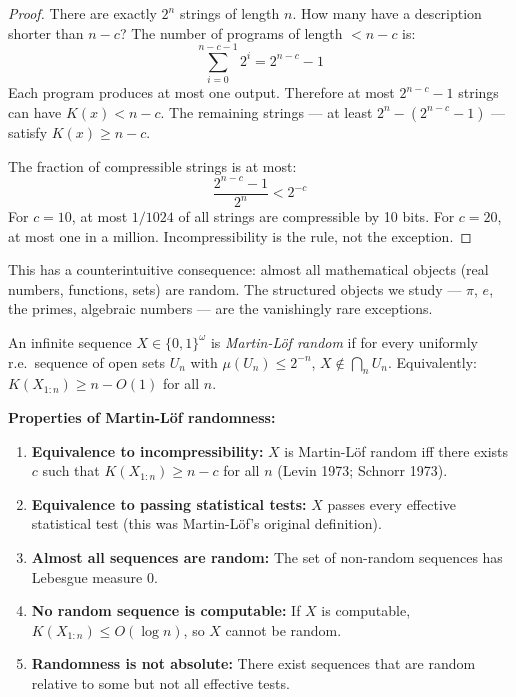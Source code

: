 \begin{proof}
There are exactly $2^n$ strings of length $n$. How many have a description shorter than $n-c$? The number of programs of length $< n-c$ is:
\[
\sum_{i=0}^{n-c-1} 2^i = 2^{n-c} - 1
\]
Each program produces at most one output. Therefore at most $2^{n-c} - 1$ strings can have $K(x) < n-c$. The remaining strings --- at least $2^n - (2^{n-c} - 1)$ --- satisfy $K(x) \ge n-c$.

The fraction of compressible strings is at most:
\[
\frac{2^{n-c} - 1}{2^n} < 2^{-c}
\]
For $c = 10$, at most $1/1024$ of all strings are compressible by 10 bits. For $c = 20$, at most one in a million. Incompressibility is the rule, not the exception.
\end{proof}

This has a counterintuitive consequence: almost all mathematical objects (real numbers, functions, sets) are random. The structured objects we study --- $\pi$, $e$, the primes, algebraic numbers --- are the vanishingly rare exceptions.

\begin{definition}
An infinite sequence $X \in \{0,1\}^\omega$ is \emph{Martin-L\"of random} if for every uniformly r.e.\ sequence of open sets $U_n$ with $\mu(U_n) \le 2^{-n}$, $X \notin \bigcap_n U_n$. Equivalently: $K(X_{1:n}) \ge n - O(1)$ for all $n$.
\end{definition}

\textbf{Properties of Martin-L\"of randomness:}
\begin{enumerate}
\item \textbf{Equivalence to incompressibility:} $X$ is Martin-L\"of random iff there exists $c$ such that $K(X_{1:n}) \ge n - c$ for all $n$ (Levin 1973; Schnorr 1973).
\item \textbf{Equivalence to passing statistical tests:} $X$ passes every effective statistical test (this was Martin-L\"of's original definition).
\item \textbf{Almost all sequences are random:} The set of non-random sequences has Lebesgue measure 0.
\item \textbf{No random sequence is computable:} If $X$ is computable, $K(X_{1:n}) \le O(\log n)$, so $X$ cannot be random.
\item \textbf{Randomness is not absolute:} There exist sequences that are random relative to some but not all effective tests.
\end{enumerate}

